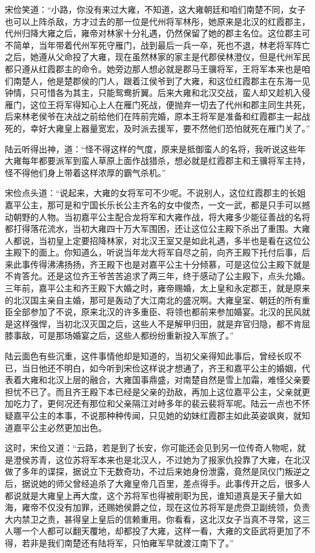宋俭笑道：“小路，你没有来过大雍，不知道，这大雍朝廷和咱们南楚不同，女子也可以上阵杀敌，方才过去的那一位是代州将军林彤，她原来是北汉的红霞郡主，代州归降大雍之后，雍帝对林家十分礼遇，仍然保留了她的郡主名位。这位郡主可不简单，当年带着代州军死守雁门，战到最后一兵一卒，死也不退，林老将军阵亡之后，她遵从父命投了大雍，现在虽然林家的家主是代郡侯林澄仪，但是代州军民都只遵从红霞郡主的命令。她旁边那人想必就是郡马王骥将军，王将军本来也是咱们南楚人，他是楚郡侯的门人，跟着江侯爷到了大雍，和这位红霞郡主在东海一见钟情，只可惜各为其主，只能鸳鸯折翼。后来大雍和北汉交战，蛮人却又趁机入侵雁门，这位王将军得知心上人在雁门死战，便抛弃一切去了代州和郡主同生共死，后来林老侯爷在决战之前给他们在阵前完婚，原本王将军是准备和红霞郡主一起战死的，幸好大雍皇上器量宽宏，及时派去援军，要不然他们恐怕就死在雁门关了。”

陆云听得出神，道：“怪不得这样的气度，原来是抵御蛮人的名将，我听说这些年大雍每年都要派军到蛮人草原上面作战猎杀，想必就是红霞郡主和王骥将军主持，怪不得他们身上带着这样浓厚的霸气杀机。”

宋俭点头道：“说起来，大雍的女将军可不少呢。不说别人，这位红霞郡主的长姐嘉平公主，那可是和宁国长乐长公主齐名的女中俊杰，一文一武，都是只手可以撼动朝野的人物。当初嘉平公主配合龙将军和大雍作战，将大雍多少能征善战的名将都打得落花流水，当初大雍四十万大军围困，还让这位公主殿下杀出了重围。大雍人都说，当初皇上定要招降林家，对北汉王室又是如此礼遇，多半也是看在这位公主殿下的面上。你知道么，听说当年龙大将军自尽之前，向齐王殿下托付后事，后来此事传得沸沸扬扬，齐王殿下也是对嘉平公主十分倾慕，可是这位公主殿下就是不肯答允。还是这位齐王爷苦苦追求了两三年，终于感动了公主殿下，点头允婚。三年前，嘉平公主和齐王殿下大婚之时，雍帝赐婚，太上皇和永定郡王，就是原来的北汉国主亲自主婚，那可是轰动了大江南北的盛况啊。大雍皇室、朝廷的所有重臣全部参加了不说，原来北汉的许多重臣、将领也都前来参加婚宴。北汉的民风就是这样强悍，当初北汉灭国之后，这些人不是解甲归田，就是弃官归隐，都不肯屈膝事敌，可是那场婚宴之后，这些人都纷纷重新投入军旅了。”

陆云面色有些沉重，这件事情他却是知道的，当初父亲得知此事后，曾经长叹不已，当日他还不明白，如今听到宋俭这样说才想通了，齐王和嘉平公主的婚姻，代表着大雍和北汉上层的融合，大雍国事鼎盛，对南楚自然是雪上加霜，难怪父亲要担忧不已了。而且齐王殿下本已经是父亲的劲敌，再加上这位嘉平公主，父亲就更加吃力了，更何况还有那位和父亲隔江对峙多年的裴云裴将军呢。陆云一点也不怀疑嘉平公主的本事，不说那种种传闻，只见她的幼妹红霞郡主如此英姿飒爽，就知道嘉平公主必然更加出色。

这时，宋俭又道：“云路，若是到了长安，你可能还会见到另一位传奇人物呢，就是澄侯苏青，这位苏将军本来也是北汉人，不过她为了报家仇投靠了大雍，在北汉做了多年的谍探，据说立下无数奇功，不过后来她身份泄露，竟然是凤仪门叛逆之后，据说她的师父曾经追杀了大雍皇帝几百里，差点得手。此事传开之后，很多人都说就是大雍皇上再大度，这个苏将军也得被削职为民，谁知道真是天子量大如海，雍帝不仅没有加罪，还赐她侯爵之位，现在这位苏将军是虎赍卫副统领，负责大内禁卫之责，甚得皇上皇后的信赖重用。你看看，这北汉女子当真不寻常，这三人哪一个人都可以翻天覆地，却都投了大雍，这样一看，大雍的文臣武将更加了不得，若非是我们南楚还有陆将军，只怕雍军早就渡江南下了。”

